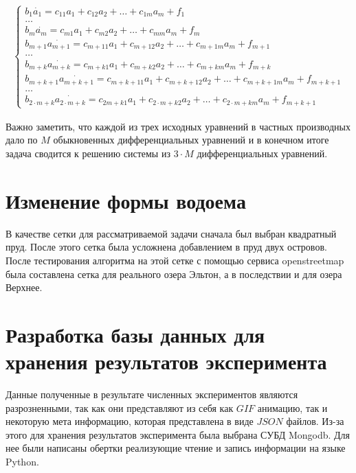 \documentclass[14pt]{extreport}
\begin{document}
\begin{eqnarray}
\begin{cases}
b_1 \dot{a_{1}} = c_{11} a_1 + c_{12} a_2 + \dots + c_{1m} a_m + f_1 \\
\dots \\
b_m \dot{a_{m}} = c_{m1} a_1 + c_{m2} a_2 + \dots + c_{mm} a_m + f_m\\
b_{m+1} \dot{a_{m+1}} = c_{{m+1}1} a_1 + c_{{m+1}2} a_2 + \dots + c_{{m+1}m} a_m + f_{m+1} \\
\dots \\
b_{m+k} \dot{a_{m+k}} = c_{{m+k}1} a_1 + c_{{m+k}2} a_2 + \dots + c_{{m+k}m} a_m + f_{m+k} \\
b_{m+k+1} \dot{a_{m+k+1}} = c_{{m+k+1}1} a_1 + c_{{m+k+1}2} a_2 + \dots + c_{{m+k+1}m} a_m + f_{m+k+1} \\
\dots \\
b_{2\cdot m + k} \dot{a_{2\cdot m + k}} = c_{{2m + k}1} a_1 + c_{{2\cdot m + k}2} a_2 + \dots + c_{{2\cdot m + k}m} a_m + f_{m+k+1}
\end{cases}
\end{eqnarray}

Важно заметить, что каждой из трех исходных уравнений в частных производных дало по $M$ обыкновенных дифференциальных уравнений и в конечном итоге задача сводится к решению системы из $3\cdot M$ дифференциальных уравнений.

\section{Изменение формы водоема}

В качестве сетки для рассматриваемой задачи сначала был выбран квадратный пруд. После этого сетка была усложнена добавлением в пруд двух островов. После тестирования алгоритма на этой сетке с помощью сервиса openstreetmap была составлена сетка для реального озера Эльтон, а в последствии и для озера Верхнее.


\section{Разработка базы данных для хранения результатов эксперимента}

Данные полученные в результате численных экспериментов являются разрозненными, так как они представляют из себя как $GIF$ анимацию, так и некоторую мета информацию, которая представлена в виде $JSON$ файлов. Из-за этого для хранения результатов эксперимента была выбрана СУБД Mongodb. Для нее были написаны обертки реализующие чтение и запись информации на языке Python.
\end{document}
